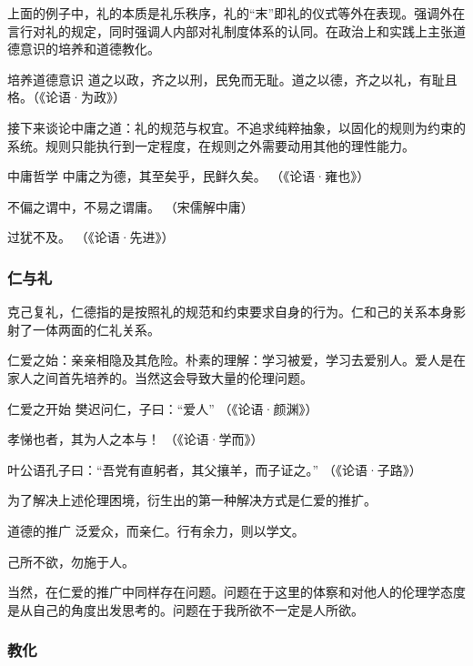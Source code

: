 上面的例子中，礼的本质是礼乐秩序，礼的“末”即礼的仪式等外在表现。强调外在言行对礼的规定，同时强调人内部对礼制度体系的认同。在政治上和实践上主张道德意识的培养和道德教化。

\begin{fancybox}{培养道德意识}
    道之以政，齐之以刑，民免而无耻。道之以德，齐之以礼，有耻且格。（《论语·为政》）
\end{fancybox}

接下来谈论中庸之道：礼的规范与权宜。不追求纯粹抽象，以固化的规则为约束的系统。规则只能执行到一定程度，在规则之外需要动用其他的理性能力。

\begin{fancybox}{中庸哲学}
    中庸之为德，其至矣乎，民鲜久矣。   （《论语·雍也》）

    不偏之谓中，不易之谓庸。    （宋儒解中庸）

    过犹不及。     （《论语·先进》）
\end{fancybox}

\subsubsection{仁与礼}

克己复礼，仁德指的是按照礼的规范和约束要求自身的行为。仁和己的关系本身影射了一体两面的仁礼关系。

仁爱之始：亲亲相隐及其危险。朴素的理解：学习被爱，学习去爱别人。爱人是在家人之间首先培养的。当然这会导致大量的伦理问题。

\begin{fancybox}{仁爱之开始}
    樊迟问仁，子曰：“爱人”     （《论语·颜渊》）

    孝悌也者，其为人之本与！      （《论语·学而》）

    叶公语孔子曰：“吾党有直躬者，其父攘羊，而子证之。”       （《论语·子路》）
\end{fancybox}

为了解决上述伦理困境，衍生出的第一种解决方式是仁爱的推扩。

\begin{fancybox}{道德的推广}
    泛爱众，而亲仁。行有余力，则以学文。

    己所不欲，勿施于人。
\end{fancybox}

当然，在仁爱的推广中同样存在问题。问题在于这里的体察和对他人的伦理学态度是从自己的角度出发思考的。问题在于我所欲不一定是人所欲。

\subsubsection{教化}

